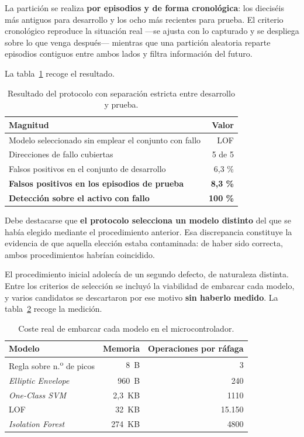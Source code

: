 La partición se realiza \textbf{por episodios y de forma cronológica}: los dieciséis más
antiguos para desarrollo y los ocho más recientes para prueba. El criterio cronológico reproduce
la situación real —se ajusta con lo capturado y se despliega sobre lo que venga después—
mientras que una partición aleatoria reparte episodios contiguos entre ambos lados y filtra
información del futuro.

La tabla~\ref{table:protocolo} recoge el resultado.

\begin{table}[ht!]
\caption{Resultado del protocolo con separación estricta entre desarrollo y prueba.}
\label{table:protocolo}
\centering
\begin{tabular}{|p{7.0cm}|r|}
\hline
\textbf{Magnitud} & \textbf{Valor} \\
\hline
Modelo seleccionado sin emplear el conjunto con fallo & LOF \\
\hline
Direcciones de fallo cubiertas & 5 de 5 \\
\hline
Falsos positivos en el conjunto de desarrollo & 6,3 \% \\
\hline
\textbf{Falsos positivos en los episodios de prueba} & \textbf{8,3 \%} \\
\hline
\textbf{Detección sobre el activo con fallo} & \textbf{100 \%} \\
\hline
\end{tabular}
\end{table}

Debe destacarse que \textbf{el protocolo selecciona un modelo distinto} del que se había elegido
mediante el procedimiento anterior. Esa discrepancia constituye la evidencia de que aquella
elección estaba contaminada: de haber sido correcta, ambos procedimientos habrían coincidido.

El procedimiento inicial adolecía de un segundo defecto, de naturaleza distinta. Entre los
criterios de selección se incluyó la viabilidad de embarcar cada modelo, y varios candidatos se
descartaron por ese motivo \textbf{sin haberlo medido}. La tabla~\ref{table:coste-nodo} recoge
la medición.

\begin{table}[ht!]
\caption{Coste real de embarcar cada modelo en el microcontrolador.}
\label{table:coste-nodo}
\centering
\begin{tabular}{|p{5.0cm}|r|r|}
\hline
\textbf{Modelo} & \textbf{Memoria} & \textbf{Operaciones por ráfaga} \\
\hline
Regla sobre n.\textsuperscript{o} de picos & \mbox{8 B} & 3 \\
\hline
\textit{Elliptic Envelope} & \mbox{960 B} & 240 \\
\hline
\textit{One-Class SVM} & \mbox{2,3 KB} & 1110 \\
\hline
LOF & \mbox{32 KB} & 15.150 \\
\hline
\textit{Isolation Forest} & \mbox{274 KB} & 4800 \\
\hline
\end{tabular}
\end{table}

